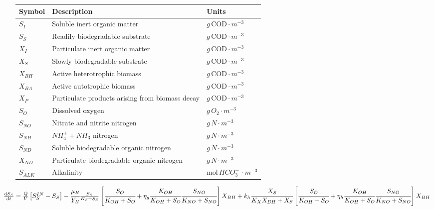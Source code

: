 \documentclass[preview,multi=pg,crop]{standalone}
\begin{document}
\begin{pg}

    \begin{tabular}{l | l l}
        Symbol 		& Description 									& Units \\ \hline \hline 
        $S_I$       		& Soluble inert organic matter                    						& $g \,\text{COD} \cdot m^{-3}$ \\
        $S_S$       	& Readily biodegradable substrate               						& $g \,\text{COD} \cdot m^{-3}$ \\
        $X_I$       		& Particulate inert organic matter                						& $g \,\text{COD} \cdot m^{-3}$ \\
        $X_S$       	& Slowly biodegradable substrate               						& $g \,\text{COD} \cdot m^{-3}$ \\
        $X_{BH}$  	& Active heterotrophic biomass                    						& $g \,\text{COD} \cdot m^{-3}$ \\
        $X_{BA}$  	& Active autotrophic biomass                      						& $g \,\text{COD} \cdot m^{-3}$ \\
        $X_{P}$   		& Particulate products arising from biomass decay 					& $g \,\text{COD} \cdot m^{-3}$ \\
        $S_O$       	& Dissolved oxygen                                							& $g \, O_2 \cdot m^{-3}$\\
        $S_{NO}$  	& Nitrate and nitrite nitrogen                    							& $g \, N \cdot m^{-3}$ \\
        $S_{NH}$  	& $NH_4^+ + NH_3$  nitrogen                      						& $g \, N \cdot m^{-3}$\\
        $S_{ND}$  	& Soluble biodegradable organic nitrogen          					& $g \, N \cdot m^{-3}$\\
        $X_{ND}$  	& Particulate biodegradable  organic nitrogen      					& $g \, N \cdot m^{-3}$ \\
        $S_{ALK}$ 	& Alkalinity                                      								& $\text{mol} \, HCO_3^- \, \cdot m^{-3}$
    \end{tabular}%
    
\end{pg}
    
$\hspace{-20pt}\frac{{\rm d}{S}_S}{{\rm d} t} =\frac{Q}{V}\left[S_S^{IN}-S_S\right] -\cfrac{\mu_H}{Y_H} \frac{S_S}{K_S+S_S}\left[\cfrac{S_O}{K_{O H}+S_O}+\eta_g \cfrac{K_{O H}}{K_{O H}+S_O} \cfrac{S_{N O}}{K_{N O}+S_{N O}}\right] X_{B H}  +k_h \cfrac{X_S}{K_X X_{B H}+X_S}\left[\cfrac{S_O}{K_{O H}+S_O}+\eta_h \cfrac{K_{O H}}{K_{O H}+S_O} \cfrac{S_{N O}}{K_{N O}+S_{N O}}\right] X_{B H}\hspace{20pt}$ 
\end{document}
